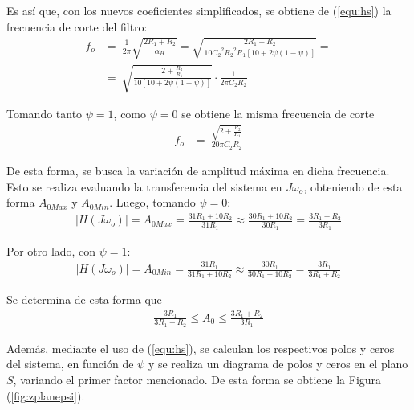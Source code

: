 Es así que, con los nuevos coeficientes simplificados, se obtiene de (\ref{equ:hs}) la frecuencia de corte del filtro:
\begin{equation}
\begin{split}
	f_o &=\ \frac{1}{2 \pi} \sqrt{\frac{2R_1 + R_2}{\alpha_H}} = \sqrt{\frac{2R_1 + R_2}{10 {C_{2}}^{2} {R_{2}}^{2} R_{1} \left[ 10 + 2 \psi \left(1 - \psi \right) \right]}} = \\
	&=\ \sqrt{\frac{2 + \frac{R_2}{R_1}}{10 \left[ 10 + 2 \psi \left(1 - \psi \right) \right]}} \cdot \frac{1}{2 \pi C_2 R_2}
\end{split}
\label{equ:fosimp}
\end{equation}

Tomando tanto $\psi = 1$, como $\psi = 0$ se obtiene la misma frecuencia de corte
\begin{equation*}
\begin{split}
	f_o &=\ \frac{\sqrt{2 + \frac{R_2}{R_1}}}{20 \pi C_2 R_2}
\end{split}
\end{equation*}

De esta forma, se busca la variación de amplitud máxima en dicha frecuencia. Esto se realiza evaluando la transferencia del sistema en $J\omega_o$, obteniendo de esta forma $A_{0Max}$ y $A_{0Min}$. Luego, tomando $\psi = 0$:
\begin{equation*}
\begin{split}
|H\left(J\omega_o\right)| = A_{0Max} = \frac{31 R_{1} + 10 R_{2}}{31 R_{1}} \approx \frac{30 R_{1} + 10 R_{2}}{30 R_{1}} = \frac{3 R_{1} + R_{2}}{3 R_{1}}
\end{split}
\end{equation*}

Por otro lado, con $\psi = 1$:
\begin{equation*}
\begin{split}
|H\left(J\omega_o\right)| = A_{0Min} = \frac{31 R_{1}}{31 R_{1} + 10 R_{2}} \approx \frac{30 R_{1}}{30 R_{1} + 10 R_{2}} = \frac{3 R_{1}}{3 R_{1} + R_{2}}
\end{split}
\end{equation*}

Se determina de esta forma que
\begin{equation*}
\begin{split}
\frac{3 R_{1}}{3 R_{1} + R_{2}} \leq A_0 \leq \frac{3 R_{1} + R_{2}}{3 R_{1}}
\end{split}
\end{equation*}

Además, mediante el uso de (\ref{equ:hs}), se calculan los respectivos polos y ceros del sistema, en función de $\psi$ y se realiza un diagrama de polos y ceros en el plano $S$, variando el primer factor mencionado. De esta forma se obtiene la Figura (\ref{fig:zplanepsi}).

